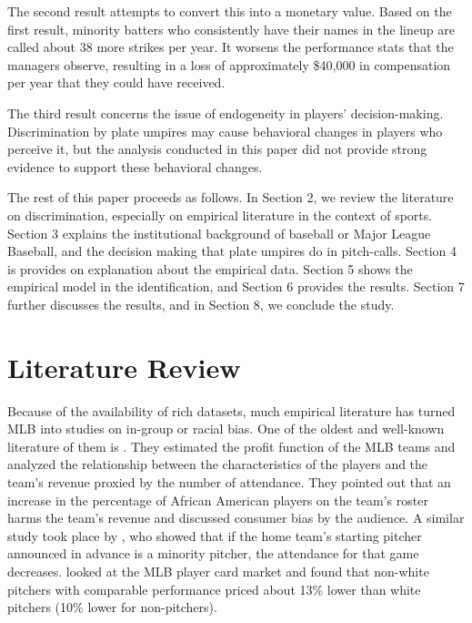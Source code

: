 \documentclass[dvipdfmx, 12pt]{jsarticle}
\begin{document}
The second result attempts to convert this into a monetary value. Based on the first result, minority batters who consistently have their names in the lineup are called about 38 more strikes per year. It worsens the performance stats that the managers observe, resulting in a loss of approximately \$40,000 in compensation per year that they could have received.

The third result concerns the issue of endogeneity in players' decision-making. Discrimination by plate umpires may cause behavioral changes in players who perceive it, but the analysis conducted in this paper did not provide strong evidence to support these behavioral changes.

The rest of this paper proceeds as follows. In Section 2, we review the literature on discrimination, especially on empirical literature in the context of sports. Section 3 explains the institutional background of baseball or Major League Baseball, and the decision making that plate umpires do in pitch-calls. Section 4 is provides on explanation about the empirical data. Section 5 shows the empirical model in the identification, and Section 6 provides the results. Section 7 further discusses the results, and in Section 8, we conclude the study.

\section{Literature Review}

Because of the availability of rich datasets, much empirical literature has turned MLB into studies on in-group or racial bias. One of the oldest and well-known literature of them is \citet{Scully_1974}. They estimated the profit function of the MLB teams and analyzed the relationship between the characteristics of the players and the team's revenue proxied by the number of attendance. They pointed out that an increase in the percentage of African American players on the team's roster harms the team's revenue and discussed consumer bias by the audience. A similar study took place by \citet{Hill1982}, who showed that if the home team's starting pitcher announced in advance is a minority pitcher, the attendance for that game decreases. \citet{Nardinelli1990} looked at the MLB player card market and found that non-white pitchers with comparable performance priced about 13\% lower than white pitchers (10\% lower for non-pitchers).
\end{document}
